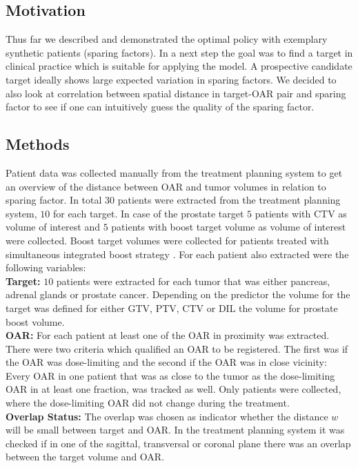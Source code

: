 \documentclass[\relativeRoot/ada.tex]{subfiles}
\begin{document}
\subsection{Motivation}
Thus far we described and demonstrated the optimal policy with exemplary synthetic patients (sparing factors). In a next step the goal was to find a target in clinical practice which is suitable for applying the model. A prospective candidate target ideally shows large expected variation in sparing factors. We decided to also look at correlation between spatial distance in target-OAR pair and sparing factor to see if one can intuitively guess the quality of the sparing factor.


\subsection{Methods}
Patient data was collected manually from the treatment planning system to get an overview of the distance between OAR and tumor volumes in relation to sparing factor. In total $30$ patients were extracted from the treatment planning system, $10$ for each target. In case of the prostate target $5$ patients with CTV as volume of interest and $5$ patients with boost target volume as volume of interest were collected. Boost target volumes were collected for patients treated with simultaneous integrated boost strategy \cite{orlandi_sib_clinical} \cite{mohan_sib}. For each patient also extracted were the following variables:\\

\textbf{Target:} $10$ patients were extracted for each tumor that was either pancreas, adrenal glands or prostate cancer. Depending on the predictor the volume for the target was defined for either GTV, PTV, CTV or DIL the volume for prostate boost volume.\\

\textbf{OAR:} For each patient at least one of the OAR in proximity was extracted. There were two criteria which qualified an OAR to be registered. The first was if the OAR was dose-limiting and the second if the OAR was in close vicinity: Every OAR in one patient that was as close to the tumor as the dose-limiting OAR in at least one fraction, was tracked as well. Only patients were collected, where the dose-limiting OAR did not change during the treatment.\\

\textbf{Overlap Status:} The overlap was chosen as indicator whether the distance $w$ will be small between target and OAR. In the treatment planning system it was checked if in one of the sagittal, transversal or coronal plane there was an overlap between the target volume and OAR.\\
\end{document}
